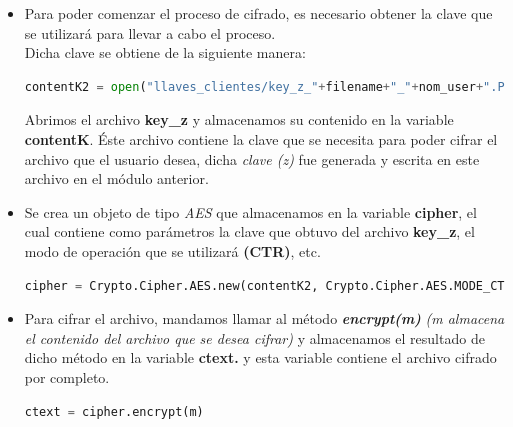 \begin{itemize}

	\item Para poder comenzar el proceso de cifrado, es necesario obtener la clave que se utilizará para llevar a cabo el proceso. \\ Dicha clave se obtiene de la siguiente manera: 

	\begin{lstlisting}[language=Python,frame=single, keywordstyle=\color{blue},breaklines=true,showstringspaces=false]
 	contentK2 = open("llaves_clientes/key_z_"+filename+"_"+nom_user+".PEM", "rb").read()
	\end{lstlisting}

Abrimos el archivo \textbf{key\_z} y almacenamos su contenido en la variable \textbf{contentK}. Éste archivo contiene la clave que se necesita para poder cifrar el archivo que el usuario desea, dicha \textit{clave (z)} fue generada y escrita en este archivo en el módulo anterior. 

	\item Se crea un objeto de tipo \textit{AES} que almacenamos en la variable \textbf{cipher}, el cual contiene como parámetros la clave que obtuvo del archivo  \textbf{key\_z}, el modo de operación que se utilizará \textbf{(CTR)}, etc.
			
\begin{lstlisting}[language=Python,frame=single, keywordstyle=\color{blue},breaklines=true,showstringspaces=false]
cipher = Crypto.Cipher.AES.new(contentK2, Crypto.Cipher.AES.MODE_CTR, counter=ctr)
\end{lstlisting}

	\item Para cifrar el archivo, mandamos llamar al método \textbf{\textit{encrypt(m)}} \textit{(m almacena el contenido del archivo que se desea cifrar)} y almacenamos el resultado de dicho método en la variable \textbf{ctext.} y esta variable contiene el archivo cifrado por completo.
			
	\begin{lstlisting}[language=Python,frame=single, keywordstyle=\color{blue},breaklines=true,showstringspaces=false]
		ctext = cipher.encrypt(m)
	\end{lstlisting}



\end{itemize}


